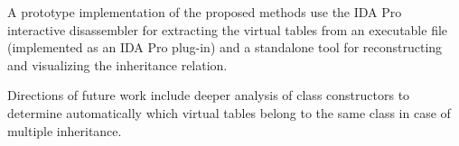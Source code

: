 \documentclass[times, 10pt,twocolumn]{article}
\begin{document}
A prototype implementation of the proposed methods use the IDA Pro
interactive disassembler for extracting the virtual tables from
an executable file (implemented as an IDA Pro plug-in)
and a standalone tool for reconstructing and visualizing
the inheritance relation.



Directions of future work include deeper analysis of class constructors to
determine automatically which virtual tables belong to the same class
in case of multiple inheritance.




\end{document}
